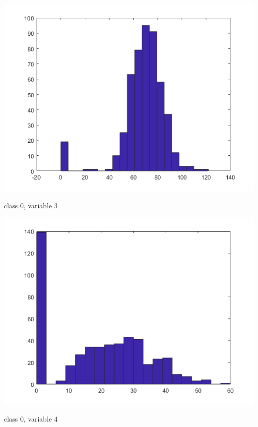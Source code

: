 \documentclass[a4paper]{article}
\begin{document}
\begin{center}
    \includegraphics[scale=1]{0-3.png}
    \caption{class 0, variable 3}
\end{center}

\begin{center}
    \includegraphics[scale=1]{0-4.png}
    \caption{class 0, variable 4}
\end{center}
\end{document}
